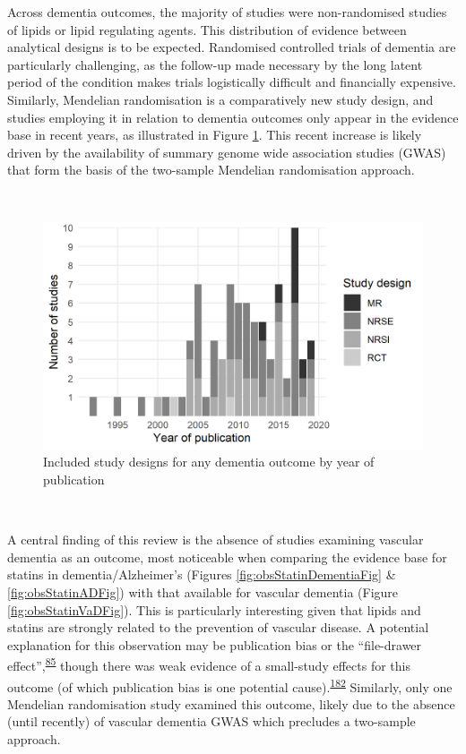 \documentclass[a4paper, twoside]{templates/ociamthesis}
\begin{document}
Across dementia outcomes, the majority of studies were non-randomised studies of lipids or lipid regulating agents. This distribution of evidence between analytical designs is to be expected. Randomised controlled trials of dementia are particularly challenging, as the follow-up made necessary by the long latent period of the condition makes trials logistically difficult and financially expensive. Similarly, Mendelian randomisation is a comparatively new study design, and studies employing it in relation to dementia outcomes only appear in the evidence base in recent years, as illustrated in Figure \ref{fig:typeByYear}. This recent increase is likely driven by the availability of summary genome wide association studies (GWAS) that form the basis of the two-sample Mendelian randomisation approach.

~





\begin{figure}[H]
\includegraphics[width=1\linewidth]{figures/sys-rev/type_by_year} \caption[Study designs by year of publication]{Included study designs for any dementia outcome by year of publication}\label{fig:typeByYear}
\end{figure}

~

A central finding of this review is the absence of studies examining vascular dementia as an outcome, most noticeable when comparing the evidence base for statins in dementia/Alzheimer's (Figures \ref{fig:obsStatinDementiaFig} \& \ref{fig:obsStatinADFig}) with that available for vascular dementia (Figure \ref{fig:obsStatinVaDFig}). This is particularly interesting given that lipids and statins are strongly related to the prevention of vascular disease. A potential explanation for this observation may be publication bias or the ``file-drawer effect'',\textsuperscript{\protect\hyperlink{ref-rosenthal1979}{85}} though there was weak evidence of a small-study effects for this outcome (of which publication bias is one potential cause).\textsuperscript{\protect\hyperlink{ref-sterne2011}{182}} Similarly, only one Mendelian randomisation study examined this outcome, likely due to the absence (until recently) of vascular dementia GWAS which precludes a two-sample approach.
\end{document}

